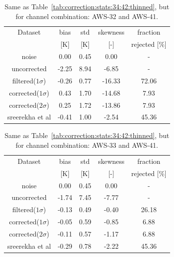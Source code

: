 \documentclass[12pt]{article}
\begin{document}
\begin{table}[!p]
	\centering
	\begin{tabular}[b]{c|c|c|c|c}
		Dataset  		  &   bias &   std & skewness & fraction \\
							&   [K]  &   [K] & [-] & rejected [\%]\\
		\hline
noise             		&   0.00 &  0.45 &               0.00 &                - \\
uncorrected       		&  -2.25 &  8.94 &              -6.85 &                 - \\
filtered($1\sigma$)  	&  -0.26 &  0.77 &             -16.33 &               72.06 \\
corrected($1\sigma$) 	&   0.43 &  1.70 &             -14.68 &                7.93 \\
corrected($2\sigma$) 	&   0.25 &  1.72 &             -13.86 &                7.93 \\
sreerekha et al   		&  -0.41 &  1.00 &              -2.54 &               45.36 \\
\hline
	\end{tabular}
	\caption{Same as Table~\ref{tab:correction:stats:34:42:thinned}, but for channel combination: AWS-32 and AWS-41.   }
	\label{tab:correction:stats:32:41}
\end{table}

\begin{table}[!p]
	\centering
	\begin{tabular}[b]{c|c|c|c|c}
		Dataset  		  &   bias &   std &  skewness  & fraction\\
						&   [K]  &   [K] & [-]  & rejected [\%]\\
		\hline
	noise       	    	&  0.00 &  0.45 &               0.00 &               - \\
	uncorrected	    		&  -1.74 &  7.45 &              -7.77 &                - \\
	filtered($1\sigma$)  	&  -0.13 &  0.49 &              -0.40 &               26.18 \\
	corrected($1\sigma$) 	&  -0.05 &  0.59 &              -0.85 &                6.88 \\
	corrected($2\sigma$) 	&  -0.11 &  0.57 &              -1.17 &                6.88 \\
	sreerekha et al   		&  -0.29 &  0.78 &              -2.22 &               45.36 \\
		\hline
	\end{tabular}
	\caption{Same as Table~\ref{tab:correction:stats:34:42:thinned}, but for channel combination: AWS-33 and AWS-41.   }
	\label{tab:correction:stats:33:41}
\end{table}
\end{document}

